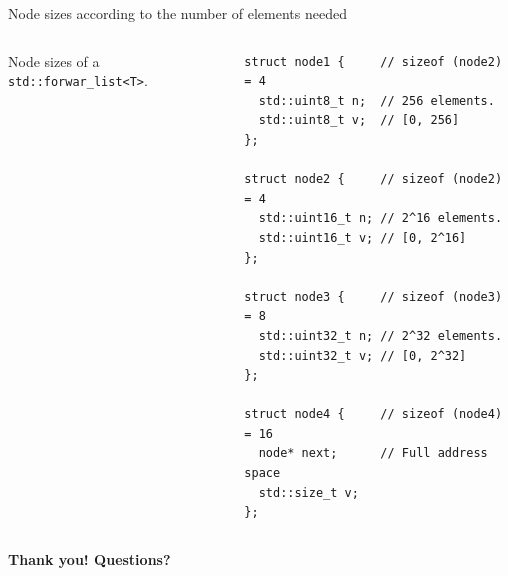 \documentclass[10pt,aspectratio=169]{beamer}
\def\mbu{\node[style=mbu]}
\def\mbd{\node[style=mbd]}
\def\mbq{\node[style=mbq]}
\def\mbo{\node[style=mbo]}
\def\ebu{\node[style=ebu]}
\def\ebd{\node[style=ebd]}
\def\ebq{\node[style=ebq]}
\def\ebo{\node[style=ebo]}
\begin{document}
\begin{frame}[fragile]{Node sizes according to the number of elements needed}
\begin{columns}
\begin{column}{0.5\textwidth}

Node sizes of a \texttt{std::forwar\_list<T>}.


\end{column}
\begin{column}{0.5\textwidth}

\begin{lstlisting}
struct node1 {     // sizeof (node2) = 4
  std::uint8_t n;  // 256 elements.
  std::uint8_t v;  // [0, 256]
};

struct node2 {     // sizeof (node2) = 4
  std::uint16_t n; // 2^16 elements.
  std::uint16_t v; // [0, 2^16]
};

struct node3 {     // sizeof (node3) = 8
  std::uint32_t n; // 2^32 elements.
  std::uint32_t v; // [0, 2^32]
};

struct node4 {     // sizeof (node4) = 16
  node* next;      // Full address space
  std::size_t v;
};

\end{lstlisting}

\end{column}
\end{columns}

\end{frame}

\begin{frame}{}
    \vspace{1cm}
    \begin{center}
        {\Large \bf Thank you! Questions?} 
    \end{center}
\end{frame}
\end{document}
